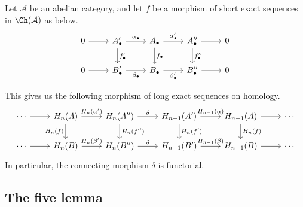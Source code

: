 \documentclass[main.tex]{subfiles}
\begin{document}
\begin{lemma}
  \label{lemma:connecting_homomorphism_is_functorial}
  Let $\mathcal{A}$ be an abelian category, and let $f$ be a morphism of short exact sequences in $\Ch(\mathcal{A})$ as below.
  \begin{equation*}
    \begin{tikzcd}
      0
      \arrow[r]
      & A'_{\bullet}
      \arrow[r, "\alpha_{\bullet}"]
      \arrow[d, "f'_{\bullet}"]
      & A_{\bullet}
      \arrow[r, "\alpha'_{\bullet}"]
      \arrow[d, "f_{\bullet}"]
      & A''_{\bullet}
      \arrow[r]
      \arrow[d, "f''_{\bullet}"]
      & 0
      \\
      0
      \arrow[r]
      & B'_{\bullet}
      \arrow[r, swap, "\beta_{\bullet}"]
      & B_{\bullet}
      \arrow[r, swap, "\beta'_{\bullet}"]
      & B''_{\bullet}
      \arrow[r]
      & 0
    \end{tikzcd}
  \end{equation*}

  This gives us the following morphism of long exact sequences on homology.
  \begin{equation*}
    \begin{tikzcd}
      \cdots
      \arrow[r]
      & H_{n}(A)
      \arrow[r, "H_{n}(\alpha')"]
      \arrow[d, swap, "H_{n}(f)"]
      & H_{n}(A'')
      \arrow[r, "\delta"]
      \arrow[d, "H_{n}(f'')"]
      & H_{n-1}(A')
      \arrow[r, "H_{n-1}(\alpha)"]
      \arrow[d, "H_{n}(f')"]
      & H_{n-1}(A)
      \arrow[d, "H_{n}(f)"]
      \arrow[r]
      & \cdots
      \\
      \cdots
      \arrow[r]
      & H_{n}(B)
      \arrow[r, "H_{n}(\beta')"]
      & H_{n}(B'')
      \arrow[r, "\delta"]
      & H_{n-1}(B')
      \arrow[r, "H_{n-1}(\beta)"]
      & H_{n-1}(B)
      \arrow[r]
      & \cdots
    \end{tikzcd}
  \end{equation*}
  In particular, the connecting morphism $\delta$ is functorial.
\end{lemma}

\subsection{The five lemma}
\label{ssc:the_five_lemma}
\end{document}
